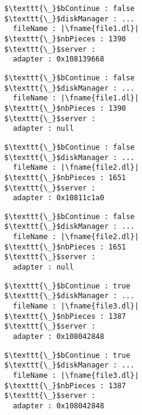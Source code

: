 \begin{figure}
\lstset{linewidth=3.8cm, numbers=none}
\newcommand{\qq}{\texttt{\symbol{34}}}
\newcommand{\fname}[1]{``\,{#1}\,''}
\begin{minipage}{3.8cm}
\begin{lstlisting}
$\texttt{\_}$bContinue : false
$\texttt{\_}$diskManager : ...
  fileName : |\fname{file1.dl}|
$\texttt{\_}$nbPieces : 1390
$\texttt{\_}$server :
  adapter : 0x108139668
\end{lstlisting}
\end{minipage}
\begin{minipage}{\textwidth / 2}
\begin{lstlisting}
$\texttt{\_}$bContinue : false
$\texttt{\_}$diskManager : ...
  fileName : |\fname{file1.dl}|
$\texttt{\_}$nbPieces : 1390
$\texttt{\_}$server :
  adapter : null
\end{lstlisting}
\end{minipage}
\begin{minipage}{\textwidth / 2}
\begin{lstlisting}
$\texttt{\_}$bContinue : false
$\texttt{\_}$diskManager : ...
  fileName : |\fname{file2.dl}|
$\texttt{\_}$nbPieces : 1651
$\texttt{\_}$server :
  adapter : 0x10811c1a0
\end{lstlisting}
\end{minipage}
\begin{minipage}{\textwidth / 2}
\begin{lstlisting}
$\texttt{\_}$bContinue : false
$\texttt{\_}$diskManager : ...
  fileName : |\fname{file2.dl}|
$\texttt{\_}$nbPieces : 1651
$\texttt{\_}$server :
  adapter : null
\end{lstlisting}
\end{minipage}
\begin{minipage}{\textwidth / 2}
\begin{lstlisting}
$\texttt{\_}$bContinue : true
$\texttt{\_}$diskManager : ...
  fileName : |\fname{file3.dl}|
$\texttt{\_}$nbPieces : 1387
$\texttt{\_}$server :
  adapter : 0x108042848
\end{lstlisting}
\end{minipage}
\begin{minipage}{\textwidth / 2}
\begin{lstlisting}
$\texttt{\_}$bContinue : true
$\texttt{\_}$diskManager : ...
  fileName : |\fname{file3.dl}|
$\texttt{\_}$nbPieces : 1387
$\texttt{\_}$server :
  adapter : 0x108042848
\end{lstlisting}
\end{minipage}

\end{figure}
